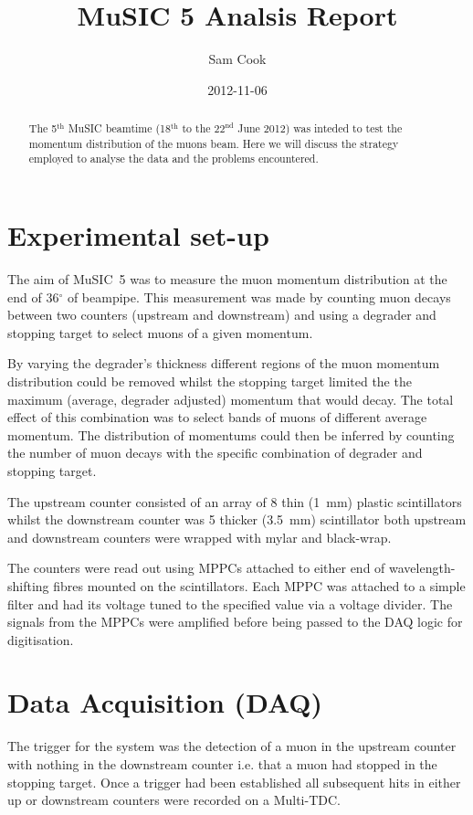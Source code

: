 \documentclass[]{article}
\title{MuSIC 5 Analsis Report}
\author{Sam Cook}
\date{2012-11-06}
\newcommand{\nth}[1]{#1\(^\text{th}\)}
\newcommand{\nthTwo}[2]{\(#1^\text{#2}\)}
\begin{document}
\ifpdf
{}
\else
{}
\fi

\maketitle


\begin{abstract}
	The \nth{5} MuSIC beamtime (\nth{18} to the \nthTwo{22}{nd} June 2012) was inteded to test the momentum distribution of the muons beam. Here we will discuss the strategy employed to analyse the data and the problems encountered.
\end{abstract}

\section{Experimental set-up}
The aim of MuSIC~5 was to measure the muon momentum distribution at the end of 36\(^{\circ}\) of beampipe. This measurement was made by counting muon decays between two counters (upstream and downstream) and using a degrader and stopping target to select muons of a given momentum. 

By varying the degrader's thickness different regions of the muon momentum distribution could be removed whilst the stopping target limited the the maximum (average, degrader adjusted) momentum that would decay. The total effect of this combination was to select bands of muons of different average momentum. The distribution of momentums could then be inferred by counting the number of muon decays with the specific combination of degrader and stopping target.

The upstream counter consisted of an array of 8 thin (1~mm) plastic scintillators whilst the downstream counter was 5 thicker (3.5~mm) scintillator both upstream and downstream counters were wrapped with mylar and black-wrap.

The counters were read out using MPPCs attached to either end of wavelength-shifting fibres mounted on the scintillators. Each MPPC was attached to a simple filter and had its voltage tuned to the specified value via a voltage divider. The signals from the MPPCs were amplified before being passed to the DAQ logic for digitisation.

\section{Data Acquisition (DAQ)}
The trigger for the system was the detection of a muon in the upstream counter with nothing in the downstream counter i.e. that a muon had stopped in the stopping target. Once a trigger had been established all subsequent hits in either up or downstream counters were recorded on a Multi-TDC.
\end{document}
